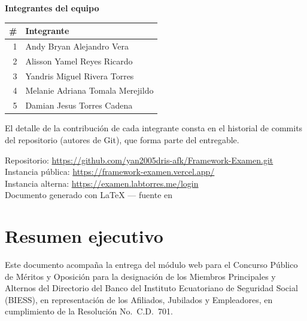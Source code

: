 \documentclass[11pt,a4paper]{article}
\begin{document}
\begin{titlepage}
\begin{center}
\begin{minipage}{0.92\textwidth}
\vspace{0.6cm}

\textbf{\color{upseAzul}Integrantes del equipo}

\vspace{0.25cm}

\begin{tabularx}{\textwidth}{@{}r X@{}}
\toprule
\# & \textbf{Integrante} \\
\midrule
1 & Andy Bryan Alejandro Vera \\
2 & Alisson Yamel Reyes Ricardo \\
3 & Yandris Miguel Rivera Torres \\
4 & Melanie Adriana Tomala Merejildo \\
5 & Damian Jesus Torres Cadena \\
\bottomrule
\end{tabularx}

\vspace{0.25cm}
{\footnotesize\color{upseGris}El detalle de la contribuci\'on de cada integrante consta en el
historial de commits del repositorio (autores de Git), que forma parte del entregable.}

\end{minipage}
\end{center}

\vfill

\begin{center}
{\footnotesize\color{upseGris}
Repositorio: \url{https://github.com/yan2005dris-afk/Framework-Examen.git}\\
Instancia p\'ublica: \url{https://framework-examen.vercel.app/}\\
Instancia alterna: \url{https://examen.labtorres.me/login}\\
Documento generado con \LaTeX{} --- fuente en }
\end{center}

\end{titlepage}

\tableofcontents
\thispagestyle{plain}
\vfill
\newpage

\section{Resumen ejecutivo}

Este documento acompaña la entrega del m\'odulo web para el Concurso P\'ublico de M\'eritos y Oposici\'on
para la designaci\'on de los Miembros Principales y Alternos del Directorio del Banco del Instituto
Ecuatoriano de Seguridad Social (BIESS), en representaci\'on de los Afiliados, Jubilados y Empleadores,
en cumplimiento de la Resoluci\'on No.\ C.D.\ 701.
\end{document}
